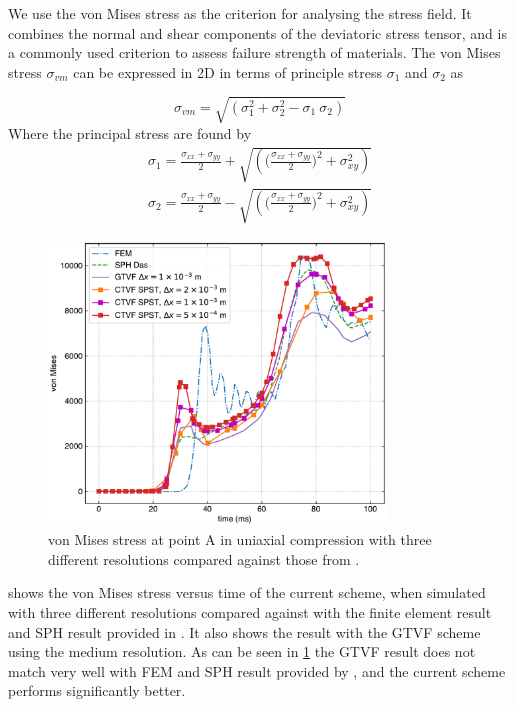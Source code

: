 We use the von Mises stress as the criterion for analysing the stress field.
It combines the normal and shear components of the deviatoric stress tensor,
and is a commonly used criterion to assess failure strength of materials. The
von Mises stress $\sigma_{vm}$ can be expressed in 2D in terms of principle
stress $\sigma_1$ and $\sigma_2$ as

\begin{equation}
  \label{eq:von_mises_with_principal_stress}
  \sigma_{vm} = \sqrt{\left(\sigma_1^2 + \sigma_2^2 - \sigma_1 \ \sigma_2\right)}
\end{equation}
%
%
Where the principal stress are found by
\begin{eqnarray}
  \label{eq:principal_stress}
  \sigma_{1} = \frac{\sigma_{xx} + \sigma_{yy}}{2} + \sqrt{\left(\bigg(
  \frac{\sigma_{xx} + \sigma_{yy}}{2}\bigg)^2 + \sigma_{xy}^2\right)}\\
  \sigma_{2} = \frac{\sigma_{xx} + \sigma_{yy}}{2} -  \sqrt{\left(\bigg(
  \frac{\sigma_{xx} + \sigma_{yy}}{2}\bigg)^2 + \sigma_{xy}^2\right)}
\end{eqnarray}
%
\begin{figure}
  \centering
  \includegraphics[width=0.8\textwidth]{figures/ctvf/figures/uniaxial_compression/von_mises_A}
  \caption{von Mises stress at point A in uniaxial compression with three
    different resolutions compared against those from
    \citep{das2015evaluation}.}
\label{fig:uniaxial}
\end{figure}

 shows the von Mises stress versus time of the current
scheme, when simulated with three different resolutions compared against with
the finite element result and SPH result provided in \citep{das2015evaluation}.
It also shows the result with the GTVF scheme using the medium resolution. As
can be seen in \cref{fig:uniaxial} the GTVF result does not match very well
with FEM and SPH result provided by \cite{das2015evaluation}, and the current
scheme performs significantly better.

